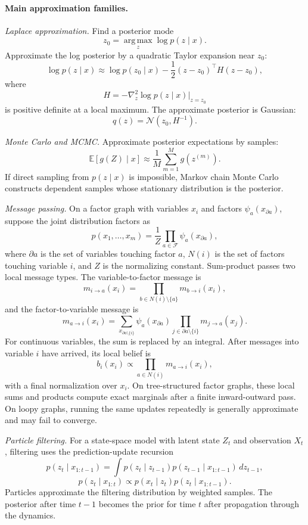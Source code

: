 \paragraph{Main approximation families.}
\emph{Laplace approximation.} Find a posterior mode
\[
z_0=\operatorname*{arg\,max}_z \log p(z\mid x).
\]
Approximate the log posterior by a quadratic Taylor expansion near \(z_0\):
\[
\log p(z\mid x)\approx \log p(z_0\mid x)
-\frac12(z-z_0)^\top H(z-z_0),
\]
where
\[
H=-\nabla_z^2\log p(z\mid x)\big|_{z=z_0}
\]
is positive definite at a local maximum. The approximate posterior is Gaussian:
\[
q(z)=\mathcal N(z_0,H^{-1}).
\]

\emph{Monte Carlo and MCMC.} Approximate posterior expectations by samples:
\[
\mathbb E[g(Z)\mid x]\approx \frac1M\sum_{m=1}^M g(z^{(m)}).
\]
If direct sampling from \(p(z\mid x)\) is impossible, Markov chain Monte Carlo constructs dependent samples whose stationary distribution is the posterior.

\emph{Message passing.} On a factor graph with variables \(x_i\) and factors \(\psi_a(x_{\partial a})\), suppose the joint distribution factors as
\[
p(x_1,\ldots,x_m)=\frac{1}{Z}\prod_{a\in\mathcal F}\psi_a(x_{\partial a}),
\]
where \(\partial a\) is the set of variables touching factor \(a\), \(N(i)\) is the set of factors touching variable \(i\), and \(Z\) is the normalizing constant. Sum-product passes two local message types. The variable-to-factor message is
\[
\boxed{
m_{i\to a}(x_i)=\prod_{b\in N(i)\setminus\{a\}}m_{b\to i}(x_i),
}
\]
and the factor-to-variable message is
\[
\boxed{
m_{a\to i}(x_i)
=
\sum_{x_{\partial a\setminus\{i\}}}
\psi_a(x_{\partial a})
\prod_{j\in\partial a\setminus\{i\}}m_{j\to a}(x_j).
}
\]
For continuous variables, the sum is replaced by an integral. After messages into variable \(i\) have arrived, its local belief is
\[
b_i(x_i)\propto \prod_{a\in N(i)}m_{a\to i}(x_i),
\]
with a final normalization over \(x_i\). On tree-structured factor graphs, these local sums and products compute exact marginals after a finite inward-outward pass. On loopy graphs, running the same updates repeatedly is generally approximate and may fail to converge.

\emph{Particle filtering.} For a state-space model with latent state \(Z_t\) and observation \(X_t\), filtering uses the prediction-update recursion
\[
p(z_t\mid x_{1:t-1})
=\int p(z_t\mid z_{t-1})p(z_{t-1}\mid x_{1:t-1})\,dz_{t-1},
\]
\[
\boxed{
p(z_t\mid x_{1:t})
\propto
p(x_t\mid z_t)p(z_t\mid x_{1:t-1}).
}
\]
Particles approximate the filtering distribution by weighted samples. The posterior after time \(t-1\) becomes the prior for time \(t\) after propagation through the dynamics.

